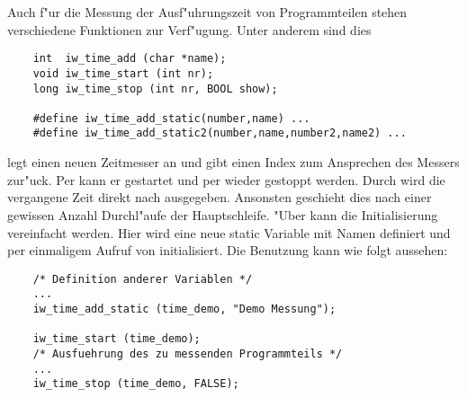 Auch f"ur die Messung der Ausf"uhrungszeit von Programmteilen stehen
verschiedene Funktionen zur Verf"ugung. Unter anderem sind dies
\begin{small}
\linespread{0.9}
\begin{verbatim}
    int  iw_time_add (char *name);
    void iw_time_start (int nr);
    long iw_time_stop (int nr, BOOL show);

    #define iw_time_add_static(number,name) ...
    #define iw_time_add_static2(number,name,number2,name2) ...
\end{verbatim}
\end{small}
 legt einen neuen Zeitmesser an und gibt einen
Index zum Ansprechen des Messers zur"uck. Per
 kann er gestartet und per
 wieder gestoppt werden. Durch  wird die vergangene Zeit direkt nach 
ausgegeben. Ansonsten geschieht dies nach einer gewissen Anzahl
Durchl"aufe der Hauptschleife. "Uber 
kann die Initialisierung vereinfacht werden. Hier wird eine neue
static Variable mit Namen  definiert und per einmaligem
Aufruf von  initialisiert. Die Benutzung kann
wie folgt aussehen:
\begin{small}
\linespread{0.9}
\begin{verbatim}
    /* Definition anderer Variablen */
    ...
    iw_time_add_static (time_demo, "Demo Messung");

    iw_time_start (time_demo);
    /* Ausfuehrung des zu messenden Programmteils */
    ...
    iw_time_stop (time_demo, FALSE);
\end{verbatim}
\end{small}

